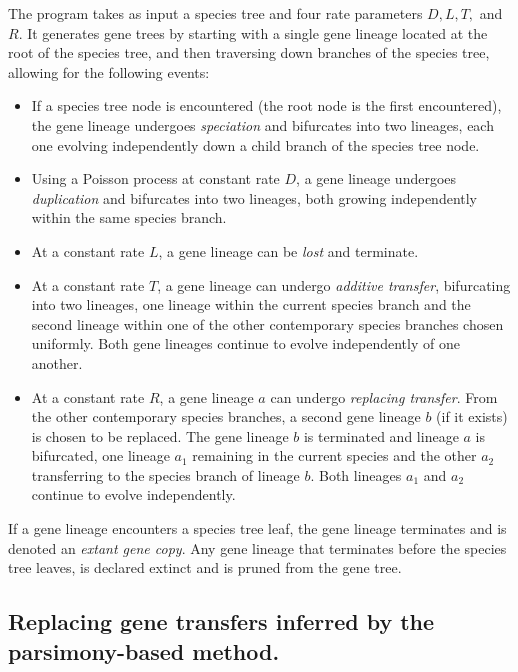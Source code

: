 \documentclass[12pt]{article}
\providecommand{\\}{\\}
\begin{document}
The program takes as input a species tree and four rate parameters $D,L,T,$ 
and $R.$
It generates gene trees by starting with a single gene lineage located at the
root of the species tree, and then traversing down branches of the species
tree, allowing for the following events: 
\begin{itemize}
\item If a species tree node is encountered (the root node is the
  first encountered), the gene lineage undergoes {\em speciation} and
  bifurcates into two lineages, each one evolving independently down a
  child branch of the species tree node.  
\item Using a Poisson process at constant rate $D$, a gene lineage
  undergoes {\em duplication} and bifurcates into two lineages, both
  growing independently within the same species branch.  
\item At a constant rate $L$, a gene lineage can be {\em lost} and
  terminate.  
\item At a constant rate $T$, a gene lineage can undergo {\em additive
  transfer}, bifurcating into two lineages, one lineage within
  the current species branch and the second lineage within one
  of the other contemporary species branches chosen uniformly.  Both
  gene lineages continue to evolve independently of one another.  
\item At a constant rate $R$, a gene lineage $a$ can undergo {\em replacing
  transfer}.  From the other contemporary species branches, a second
  gene lineage $b$ (if it exists) is chosen to be replaced.  The gene
  lineage $b$ is terminated and lineage $a$ is bifurcated, one lineage $a_1$
  remaining in the current species and the other $a_2$ transferring to the
  species branch of lineage $b$.  Both lineages $a_1$ and $a_2$ continue
  to evolve independently.
\end{itemize}

If a gene lineage encounters a species tree leaf, the gene lineage terminates
and is denoted an {\em extant gene copy}. Any gene lineage that terminates
before the species tree leaves, is declared extinct and is pruned from the gene
tree.

\subsection{Replacing gene transfers inferred by the parsimony-based method.}
\end{document}
